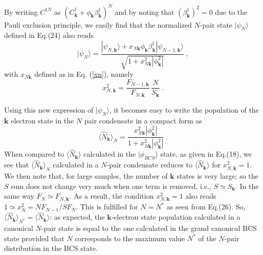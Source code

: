 \documentclass[twocolumn,showpacs]{revtex4}
\def\v#1{\mathbf{#1}}
\begin{document}
By writing $C^{\dag N}$ as $(C_{\v k}^\dag+\phi_{\v k}\beta_{\v k}^\dag)^N$ and by noting that $(\beta_{\v k}^\dag)^2=0$ due to the Pauli exclusion principle, we easily find that the normalized $N$-pair state $|\psi_N\rangle$ defined in Eq.(24) also reads
\begin{equation}
|\psi_N\rangle=\frac{|\psi_{N,\v k}\rangle+x_{N\v k}\phi_{\v k}\beta_{\v k}^\dag|\psi_{N-1,\v k}\rangle}{\sqrt{1+x_{N\v k}^2
|\phi_{\v k}^2|}}\ ,
\end{equation}
with  $x_{N\v k}$  defined as in Eq. (\ref{xn}), namely
\begin{equation}
x_{N,\v k}^2=\frac{F_{N-1,\v k}}{F_{N,\v k}}\,\frac{N}{S_{\v k}}\ .
\end{equation}
 
Using this new expression of $|\psi_N\rangle$, it becomes easy to write the population of the $\v k$ electron state in the $N$ pair condensate in a compact form as
\begin{equation}
 \langle\hat{N}_{\v{k}}\rangle_{N}=\frac{x_{N\v k}^2|\phi_{\v k}^2|}{1+x_{N\v k}^2|\phi_{\v k}^2|}\ .
\end{equation}
When compared to $ \langle\hat{N}_{\v{k}}\rangle$ calculated in the $|\phi_{BCS}\rangle$ state, as given in Eq.(18), we see that $ \langle\hat{N}_{\v{k}}\rangle_{N}$ calculated in a $N$-pair condensate reduces to $ \langle\hat{N}_{\v{k}}\rangle$ for $x_{N,\v k}^2=1$. We then note that, for large samples, the number of $\v k$ states is very large; so the $S$ sum does not change very much when one term is removed, i.e., $S\simeq S_{\v k}$. In the same way $F_N\simeq F_{N,\v k}$. As a result, the condition $x_{N,\v k}^2=1$ also reads $1\simeq x_N^2=NF_{N-1}/SF_N$. This is fulfilled for $N=N^\ast$ as seen from Eq.(26). So, $\langle\hat{N}_{\v{k}}\rangle_{N^\ast}= \langle\hat{N}_{\v{k}}\rangle$: as expected, the $\v k$-electron state population calculated in a canonical $N$-pair state is equal to the one calculated in the grand canonical BCS state provided that $N$ corresponds to the maximum value $N^\ast$ of the $N$-pair distribution in the BCS state.
\end{document}
